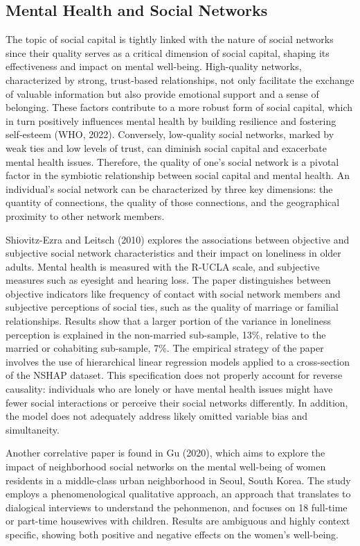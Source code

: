     \subsection{Mental Health and Social Networks}
    The topic of social capital is tightly linked with the nature of social networks since their quality serves as a critical dimension of social capital, shaping its effectiveness and impact on mental well-being. High-quality networks, characterized by strong, trust-based relationships, not only facilitate the exchange of valuable information but also provide emotional support and a sense of belonging. These factors contribute to a more robust form of social capital, which in turn positively influences mental health by building resilience and fostering self-esteem (WHO, 2022). Conversely, low-quality social networks, marked by weak ties and low levels of trust, can diminish social capital and exacerbate mental health issues. Therefore, the quality of one's social network is a pivotal factor in the symbiotic relationship between social capital and mental health.
    An individual's social network can be characterized by three key dimensions: the quantity of connections, the quality of those connections, and the geographical proximity to other network members. 
        

    Shiovitz-Ezra and Leitsch (2010) explores the associations between objective and subjective social network characteristics and their impact on loneliness in older adults. Mental health is measured with the R-UCLA scale, and subjective measures such as eyesight and hearing loss. The paper distinguishes between objective indicators like frequency of contact with social network members and subjective perceptions of social ties, such as the quality of marriage or familial relationships. Results show that a larger portion of the variance in loneliness perception is explained in the non-married sub-sample, 13\%, relative to the married or cohabiting sub-sample, 7\%.
    The empirical strategy of the paper involves the use of hierarchical linear regression models applied to a cross-section of the NSHAP dataset. This specification does not properly account for reverse causality:  individuals who are lonely or have mental health issues might have fewer social interactions or perceive their social networks differently. In addition, the model does not adequately address likely omitted variable bias and simultaneity.

    Another correlative paper is found in Gu (2020), which aims to explore the impact of neighborhood social networks on the mental well-being of women residents in a middle-class urban neighborhood in Seoul, South Korea. The study employs a phenomenological qualitative approach, an approach that translates to dialogical interviews to understand the pehonmenon, and focuses on 18 full-time or part-time housewives with children. Results are ambiguous and highly context specific, showing both positive and negative effects on the women's well-being.

